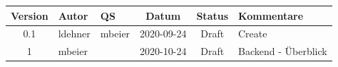 \documentclass[minted, notitle]{protocol}
\begin{document}
\begin{center}

\begin{tabular}{| c | p{1.8cm} | p{1.8cm} | c | c | p{3.4cm} |}
\hline \rowcolor{gray} \textbf{\color{white}Version} & \textbf{\color{white}Autor} & \textbf{\color{white}QS} & \textbf{\color{white}Datum} & \textbf{\color{white}Status} & \textbf{\color{white}Kommentare} \\ 
 \hline \hline
0.1 & ldehner & mbeier & 2020-09-24 & Draft & Create \\ \hline 
1   & mbeier  &        & 2020-10-24 & Draft & Backend - Überblick \\ \hline

\end{tabular}
\end{center}

\clearpage
{
  \hypersetup{linkcolor=black}
  \tableofcontents
} 
\clearpage



\end{document}
